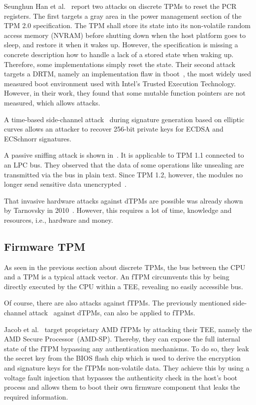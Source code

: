 Seunghun Han et al.~\cite{aBadDream} report two attacks on discrete TPMs to reset the PCR registers. The first targets a gray area in the power management section of the TPM 2.0 specification. The TPM shall store its state into its non-volatile random access memory (NVRAM) before shutting down when the host platform goes to sleep, and restore it when it wakes up. However, the specification is missing a concrete description how to handle a lack of a stored state when waking up. Therefore, some implementations simply reset the state. Their second attack targets a DRTM, namely an implementation flaw in tboot~\cite{tboot}, the most widely used measured boot environment used with Intel's Trusted Execution Technology. However, in their work, they found that some mutable function pointers are not measured, which allows attacks.

A time-based side-channel attack~\cite{Moghimi2019} during signature generation based on elliptic curves allows an attacker to recover 256-bit private keys for ECDSA and ECSchnorr signatures.

A passive sniffing attack is shown in~\cite{Kursawe2005AnalyzingTP}. It is applicable to TPM 1.1 connected to an LPC bus. They observed that the data of some operations like unsealing are transmitted via the bus in plain text. Since TPM 1.2, however, the modules no longer send sensitive data unencrypted~\cite{Winter2013}.

That invasive hardware attacks against dTPMs are possible was already shown by Tarnovsky in 2010~\cite{tarnovsky}. However, this requires a lot of time, knowledge and resources, i.e., hardware and money.

\subsection{Firmware TPM}

As seen in the previous section about discrete TPMs, the bus between the CPU and a TPM is a typical attack vector.
An fTPM circumvents this by being directly executed by the CPU within a \ac{TEE}, revealing no easily accessible bus.

Of course, there are also attacks against fTPMs.
The previously mentioned side-channel attack~\cite{Moghimi2019} against dTPMs, can also be applied to fTPMs.

Jacob et al.~\cite{Jacob2023} target proprietary AMD fTPMs by attacking their \ac{TEE}, namely the AMD Secure Processor~(AMD-SP). Thereby, they can expose the full internal state of the fTPM bypassing any authentication mechanisms. To do so, they leak the secret key from the BIOS flash chip which is used to derive the encryption and signature keys for the fTPMs non-volatile data. They achieve this by using a voltage fault injection that bypasses the authenticity check in the host's boot process and allows them to boot their own firmware component that leaks the required information.

